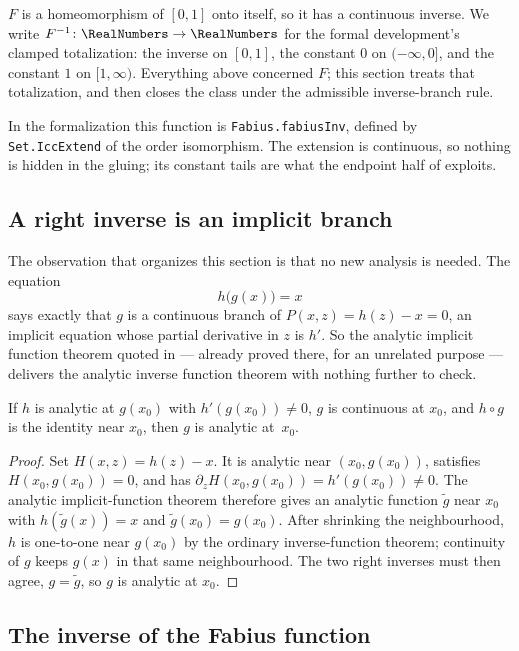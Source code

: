 $F$ is a homeomorphism of $[0,1]$ onto itself, so it has a continuous inverse.
We write $F^{-1}\colon\RealNumbers\to\RealNumbers$ for the formal development's clamped
totalization: the inverse on $[0,1]$, the constant $0$ on $(-\infty,0]$, and
the constant $1$ on $[1,\infty)$.  Everything above concerned $F$; this
section treats that totalization, and then closes the class under the
admissible inverse-branch rule.

In the formalization this function is \texttt{Fabius.fabiusInv}, defined by
\texttt{Set.IccExtend} of the order isomorphism.  The extension is continuous,
so nothing is hidden in the gluing; its constant tails are what the endpoint
half of  exploits.

\subsection{A right inverse is an implicit branch}

The observation that organizes this section is that no new analysis is
needed.  The equation
\[
  h\bigl(g(x)\bigr)=x
\]
says exactly that $g$ is a continuous branch of $P(x,z)=h(z)-x=0$, an implicit
equation whose partial derivative in $z$ is $h'$.  So the analytic implicit
function theorem quoted in  --- already proved there, for
an unrelated purpose --- delivers the analytic inverse function theorem with
nothing further to check.

\begin{theorem}\label{ne:thm:ift}
If $h$ is analytic at $g(x_0)$ with $h'(g(x_0))\ne0$, $g$ is continuous at
$x_0$, and $h\circ g$ is the identity near $x_0$, then $g$ is analytic
at~$x_0$.
\end{theorem}

\begin{proof}
Set $H(x,z)=h(z)-x$.  It is analytic near $(x_0,g(x_0))$, satisfies
$H(x_0,g(x_0))=0$, and has
$\partial_zH(x_0,g(x_0))=h'(g(x_0))\ne0$.  The analytic implicit-function
theorem therefore gives an analytic function $\widetilde g$ near $x_0$ with
$h(\widetilde g(x))=x$ and $\widetilde g(x_0)=g(x_0)$.  After shrinking the
neighbourhood, $h$ is one-to-one near $g(x_0)$ by the ordinary inverse-function
theorem; continuity of $g$ keeps $g(x)$ in that same neighbourhood.  The two
right inverses must then agree, $g=\widetilde g$, so $g$ is analytic at $x_0$.
\end{proof}

\subsection{The inverse of the Fabius function}

